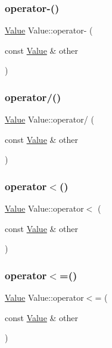 \mbox{\label{classValue_aeb5e368aaea65ed1d1ef37fef6de80fc}} 
\subsubsection{\texorpdfstring{operator-\/()}{operator-()}}
{\footnotesize\ttfamily \hyperlink{classValue}{Value} Value\+::operator-\/ (\begin{DoxyParamCaption}\item[{const \hyperlink{classValue}{Value} \&}]{other }\end{DoxyParamCaption})}

\mbox{\label{classValue_a5bee3270435124beed9a24cb78941a56}} 
\subsubsection{\texorpdfstring{operator/()}{operator/()}}
{\footnotesize\ttfamily \hyperlink{classValue}{Value} Value\+::operator/ (\begin{DoxyParamCaption}\item[{const \hyperlink{classValue}{Value} \&}]{other }\end{DoxyParamCaption})}

\mbox{\label{classValue_ab8f33387ddbc00335cb96643e61643f6}} 
\subsubsection{\texorpdfstring{operator$<$()}{operator<()}}
{\footnotesize\ttfamily \hyperlink{classValue}{Value} Value\+::operator$<$ (\begin{DoxyParamCaption}\item[{const \hyperlink{classValue}{Value} \&}]{other }\end{DoxyParamCaption})}

\mbox{\label{classValue_a38e0f17676ad08e88bedffb1e931d543}} 
\subsubsection{\texorpdfstring{operator$<$=()}{operator<=()}}
{\footnotesize\ttfamily \hyperlink{classValue}{Value} Value\+::operator$<$= (\begin{DoxyParamCaption}\item[{const \hyperlink{classValue}{Value} \&}]{other }\end{DoxyParamCaption})}


